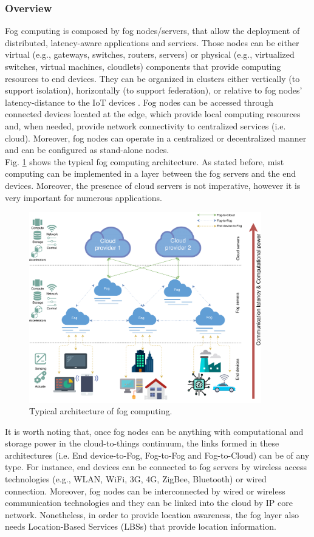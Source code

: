 \subsubsection{Overview}
\noindent\tab Fog computing is composed by fog nodes/servers, that allow the deployment of distributed, latency-aware applications and services. Those nodes can be either virtual (e.g., gateways, switches, routers, servers) or physical (e.g., virtualized switches, virtual machines, cloudlets) components that provide computing resources to end devices. They can be organized in clusters either vertically (to support isolation), horizontally (to support federation), or relative to fog nodes’ latency-distance to the IoT devices \cite{iorga2018fog}. Fog nodes can be accessed through connected devices located at the edge, which provide local computing resources and, when needed, provide network connectivity to centralized services (i.e. cloud). Moreover, fog nodes can operate in a centralized or decentralized manner and can be configured as stand-alone nodes.\\
\noindent\tab Fig. \ref{fog_architecture} shows the typical fog computing architecture. As stated before, mist computing can be implemented in a layer between the fog servers and the end devices. Moreover, the presence of cloud servers is not imperative, however it is very important for numerous applications.
\begin{figure} [t]
	\centering
	\includegraphics[width=0.9\textwidth]{images/fog_architecture/fog_architecture}
	\caption{Typical architecture of fog computing.}
	\label{fog_architecture}
\end{figure}
It is worth noting that, once fog nodes can be anything with computational and storage power in the cloud-to-things continuum, the links formed in these architectures (i.e. End device-to-Fog, Fog-to-Fog and Fog-to-Cloud) can be of any type. For instance, end devices can be connected to fog servers by wireless access technologies (e.g., WLAN, WiFi, 3G, 4G, ZigBee, Bluetooth) or wired connection. Moreover, fog nodes can be interconnected by wired or wireless communication technologies and they can be linked into the cloud by IP core network. Nonetheless, in order to provide location awareness, the fog layer also needs Location-Based Services (LBSs) that provide location information.

